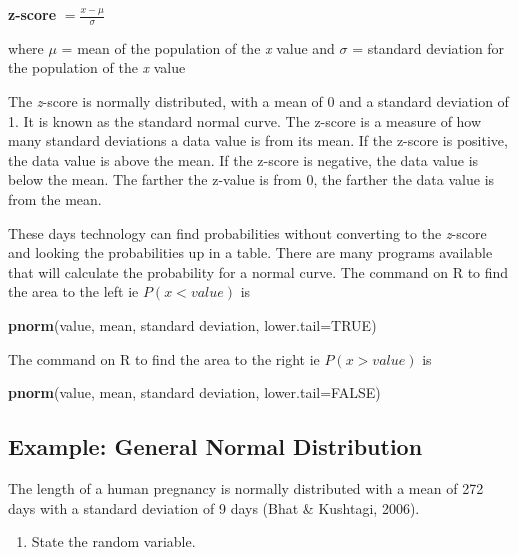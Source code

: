 \documentclass[
]{book}
\newenvironment{Shaded}{\begin{snugshade}}{\end{snugshade}}
\newcommand{\DataTypeTok}[1]{\textcolor[rgb]{0.13,0.29,0.53}{#1}}
\newcommand{\KeywordTok}[1]{\textcolor[rgb]{0.13,0.29,0.53}{\textbf{#1}}}
\newcommand{\NormalTok}[1]{#1}
\newcommand{\OtherTok}[1]{\textcolor[rgb]{0.56,0.35,0.01}{#1}}
\providecommand{\tightlist}{%
  \setlength{\itemsep}{0pt}\setlength{\parskip}{0pt}}
\begin{document}
\textbf{z-score}
\(=\frac{x-\mu}{\sigma}\)

where \(\mu\) = mean of the population of the \emph{x} value and \(\sigma\) = standard deviation for the population of the \emph{x} value

The \emph{z}-score is normally distributed, with a mean of 0 and a standard deviation of 1. It is known as the standard normal curve. The z-score is a measure of how many standard deviations a data value is from its mean. If the z-score is positive, the data value is above the mean. If the z-score is negative, the data value is below the mean. The farther the z-value is from 0, the farther the data value is from the mean.

These days technology can find probabilities without converting to the \emph{z}-score and looking the probabilities up in a table. There are many programs available that will calculate the probability for a normal curve. The command on R to find the area to the left ie \(P(x<value)\) is

\begin{Shaded}
\begin{Highlighting}[]
\KeywordTok{pnorm}\NormalTok{(value, mean, standard deviation, }\DataTypeTok{lower.tail=}\OtherTok{TRUE}\NormalTok{)}
\end{Highlighting}
\end{Shaded}

The command on R to find the area to the right ie \(P(x>value)\) is

\begin{Shaded}
\begin{Highlighting}[]
\KeywordTok{pnorm}\NormalTok{(value, mean, standard deviation, }\DataTypeTok{lower.tail=}\OtherTok{FALSE}\NormalTok{)}
\end{Highlighting}
\end{Shaded}

\hypertarget{example-general-normal-distribution}{%
\subsection{Example: General Normal Distribution}\label{example-general-normal-distribution}}

The length of a human pregnancy is normally distributed with a mean of 272 days with a standard deviation of 9 days (Bhat \& Kushtagi, 2006).

\begin{enumerate}
\def\labelenumi{\alph{enumi}.}
\tightlist
\item
  State the random variable.
\end{enumerate}
\end{document}
